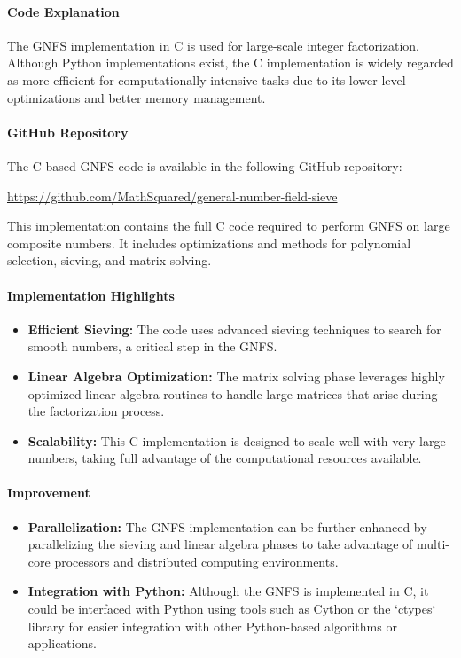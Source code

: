 \documentclass[12pt]{report}
\begin{document}
\paragraph{Code Explanation}

The GNFS implementation in C is used for large-scale integer factorization. Although Python implementations exist, the C implementation is widely regarded as more efficient for computationally intensive tasks due to its lower-level optimizations and better memory management.

\paragraph{GitHub Repository}
The C-based GNFS code is available in the following GitHub repository:
\begin{center}
    \url{https://github.com/MathSquared/general-number-field-sieve}
\end{center}

This implementation contains the full C code required to perform GNFS on large composite numbers. It includes optimizations and methods for polynomial selection, sieving, and matrix solving.

\paragraph{Implementation Highlights}
\begin{itemize}
    \item \textbf{Efficient Sieving:} The code uses advanced sieving techniques to search for smooth numbers, a critical step in the GNFS.
    \item \textbf{Linear Algebra Optimization:} The matrix solving phase leverages highly optimized linear algebra routines to handle large matrices that arise during the factorization process.
    \item \textbf{Scalability:} This C implementation is designed to scale well with very large numbers, taking full advantage of the computational resources available.
\end{itemize}

\paragraph{Improvement}
\begin{itemize}
    \item \textbf{Parallelization:} The GNFS implementation can be further enhanced by parallelizing the sieving and linear algebra phases to take advantage of multi-core processors and distributed computing environments.
    \item \textbf{Integration with Python:} Although the GNFS is implemented in C, it could be interfaced with Python using tools such as Cython or the `ctypes` library for easier integration with other Python-based algorithms or applications.
\end{itemize}
\end{document}

